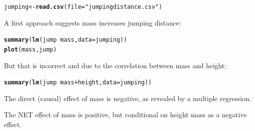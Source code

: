 \documentclass[12pt,a4paper]{scrartcl}\usepackage[]{graphicx}\usepackage[]{color}
\makeatletter
\newcommand{\hlstr}[1]{\textcolor[rgb]{0.192,0.494,0.8}{#1}}%
\newcommand{\hlopt}[1]{\textcolor[rgb]{0,0,0}{#1}}%
\newcommand{\hlstd}[1]{\textcolor[rgb]{0.345,0.345,0.345}{#1}}%
\newcommand{\hlkwb}[1]{\textcolor[rgb]{0.69,0.353,0.396}{#1}}%
\newcommand{\hlkwc}[1]{\textcolor[rgb]{0.333,0.667,0.333}{#1}}%
\newcommand{\hlkwd}[1]{\textcolor[rgb]{0.737,0.353,0.396}{\textbf{#1}}}%
\newenvironment{kframe}{%
 \def\at@end@of@kframe{}%
 \ifinner\ifhmode%
  \def\at@end@of@kframe{\end{minipage}}%
  \begin{minipage}{\columnwidth}%
 \fi\fi%
 \def\FrameCommand##1{\hskip\@totalleftmargin \hskip-\fboxsep
 \colorbox{shadecolor}{##1}\hskip-\fboxsep
     \hskip-\linewidth \hskip-\@totalleftmargin \hskip\columnwidth}%
 \MakeFramed {\advance\hsize-\width
   \@totalleftmargin\z@ \linewidth\hsize
   \@setminipage}}%
 {\par\unskip\endMakeFramed%
 \at@end@of@kframe}
\newenvironment{knitrout}{}{} %
\makeatother
\begin{document}
\begin{Answer}
\begin{knitrout}
\color{fgcolor}\begin{kframe}
\begin{alltt}
  \hlstd{jumping} \hlkwb{<-} \hlkwd{read.csv}\hlstd{(}\hlkwc{file} \hlstd{=} \hlstr{"jumpingdistance.csv"}\hlstd{)}
\end{alltt}
\end{kframe}
\end{knitrout}

A first approach suggests mass increases jumping distance:
\begin{knitrout}
\color{fgcolor}\begin{kframe}
\begin{alltt}
    \hlkwd{summary}\hlstd{(}\hlkwd{lm}\hlstd{(jump} \hlopt{~} \hlstd{mass,} \hlkwc{data}\hlstd{=jumping))}
    \hlkwd{plot}\hlstd{(mass, jump)}
\end{alltt}
\end{kframe}
\end{knitrout}

But that is incorrect and due to the correlation between mass and height:
\begin{knitrout}
\color{fgcolor}\begin{kframe}
\begin{alltt}
    \hlkwd{summary}\hlstd{(}\hlkwd{lm}\hlstd{(jump} \hlopt{~} \hlstd{mass} \hlopt{+} \hlstd{height,} \hlkwc{data}\hlstd{=jumping))}
\end{alltt}
\end{kframe}
\end{knitrout}
The direct (causal) effect of mass is negative, as revealed by a multiple regression.

The NET effect of mass is positive, but conditional on height mass as a negative effect.
\end{Answer}
\end{document}
